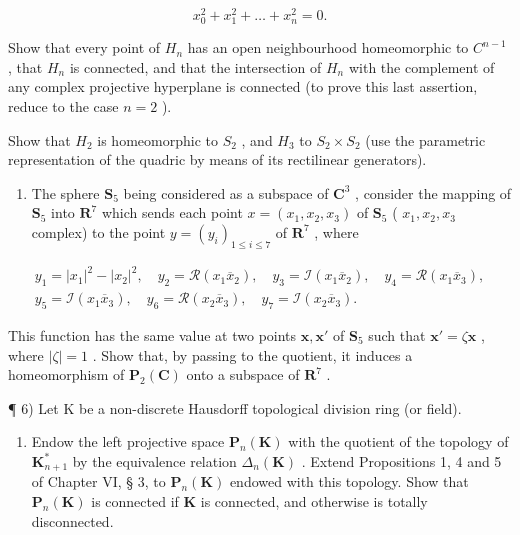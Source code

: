 \[
x _ {0} ^ {2} + x _ {1} ^ {2} + \dots + x _ {n} ^ {2} = 0.
\]

Show that every point of \(H_{n}\) has an open neighbourhood homeomorphic to \(C^{n-1}\) , that \(H_{n}\) is connected, and that the intersection of \(H_{n}\) with the complement of any complex projective hyperplane is connected (to prove this last assertion, reduce to the case \(n = 2\) ).

Show that \(H_{2}\) is homeomorphic to \(S_{2}\) , and \(H_{3}\) to \(S_{2} \times S_{2}\) (use the parametric representation of the quadric by means of its rectilinear generators).

\begin{enumerate}
\def\labelenumi{\arabic{enumi})}
\setcounter{enumi}{4}
\tightlist
\item
  The sphere \(\mathbf{S}_5\) being considered as a subspace of \(\mathbf{C}^3\) , consider the mapping of \(\mathbf{S}_5\) into \(\mathbf{R}^7\) which sends each point \(x = (x_1, x_2, x_3)\) of \(\mathbf{S}_5\) ( \(x_1, x_2, x_3\) complex) to the point \(y = (y_i)_{1 \leqslant i \leqslant 7}\) of \(\mathbf{R}^7\) , where
\end{enumerate}

\[
\begin{array}{c} y _ {1} = | x _ {1} | ^ {2} - | x _ {2} | ^ {2}, \quad y _ {2} = \mathcal {R} (x _ {1} \overline {{x}} _ {2}), \quad y _ {3} = \mathcal {I} (x _ {1} \overline {{x}} _ {2}), \quad y _ {4} = \mathcal {R} (x _ {1} \overline {{x}} _ {3}), \\ y _ {5} = \mathcal {I} (x _ {1} \overline {{x}} _ {3}), \quad y _ {6} = \mathcal {R} (x _ {2} \overline {{x}} _ {3}), \quad y _ {7} = \mathcal {I} (x _ {2} \overline {{x}} _ {3}). \end{array}
\]

This function has the same value at two points \(\pmb{x}, \pmb{x}'\) of \(\mathbf{S}_5\) such that \(\pmb{x}' = \zeta \pmb{x}\) , where \(|\zeta| = 1\) . Show that, by passing to the quotient, it induces a homeomorphism of \(\mathbf{P}_2(\mathbf{C})\) onto a subspace of \(\mathbf{R}^7\) .

¶ 6) Let K be a non-discrete Hausdorff topological division ring (or field).

\begin{enumerate}
\def\labelenumi{\alph{enumi})}
\tightlist
\item
  Endow the left projective space \(\mathbf{P}_n(\mathbf{K})\) with the quotient of the topology of \(\mathbf{K}_{n+1}^*\) by the equivalence relation \(\Delta_n(\mathbf{K})\) . Extend Propositions 1, 4 and 5 of Chapter VI, § 3, to \(\mathbf{P}_n(\mathbf{K})\) endowed with this topology. Show that \(\mathbf{P}_n(\mathbf{K})\) is connected if \(\mathbf{K}\) is connected, and otherwise is totally disconnected.
\end{enumerate}

